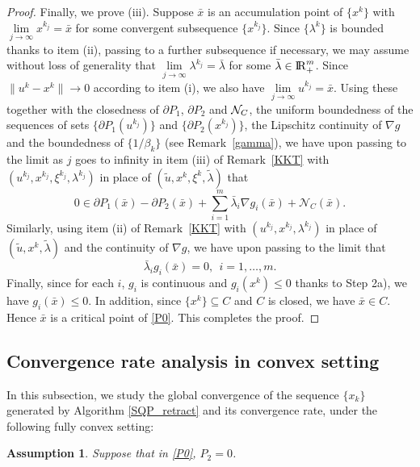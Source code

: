 \documentclass[10pt]{article}
\numberwithin{equation}{section}
\newtheorem{assumption}{Assumption}[section]
\def\R{{\rm I\!R}}
\begin{document}
\begin{proof}
Finally, we prove (iii). Suppose $\bar{x}$ is an accumulation point of $\{x^k\}$ with $\lim\limits_{j\rightarrow\infty}x^{k_j} = \bar{x}$ for some convergent subsequence $\{x^{k_j}\}$. Since $\{\lambda^k\}$ is bounded thanks to item (ii), passing to a further subsequence if necessary, we may assume without loss of generality that $\lim\limits_{j\rightarrow\infty}\lambda^{k_j} = \bar{\lambda}$ for some $\bar\lambda\in \R^m_+$. Since $\|u^k - x^k\|\rightarrow 0$ according to item (i), we also have $\lim\limits_{j\rightarrow\infty}u^{k_j} = \bar{x}$.
Using these together with the closedness of $\partial P_1$, $\partial P_2$ and ${\cal N}_C$, the uniform boundedness of the sequences of sets $\{\partial P_1(u^{k_j})\}$ and $\{\partial P_2(x^{k_j})\}$, the Lipschitz continuity of $\nabla g$ and the boundedness of $\{1/\beta_k\}$ (see Remark~\ref{gamma}), we have upon passing to the limit as $j$ goes to infinity in item (iii) of Remark~\ref{KKT} with $(u^{k_j},x^{k_j},\xi^{k_j},\lambda^{k_j})$ in place of $(\widetilde u,x^k,\xi^k,\widetilde\lambda)$ that
\[
0\in \partial P_1(\bar{x}) - \partial P_2(\bar{x}) + \sum\limits_{i=1}^m\bar{\lambda}_i\nabla g_i(\bar{x}) + \mathcal{N}_C(\bar{x}).
\]
Similarly, using item (ii) of Remark~\ref{KKT} with $(u^{k_j},x^{k_j},\lambda^{k_j})$ in place of $(\widetilde u,x^k,\widetilde\lambda)$ and the continuity of $\nabla g$, we have upon passing to the limit that
\[
\bar{\lambda}_i g_i(\bar{x}) = 0,\ \ i = 1, \ldots, m.
\]
Finally, since for each $i$, $g_i$ is continuous and $g_i(x^k)\leq0$ thanks to Step 2a), we have $g_i(\bar{x})\leq0$. In addition, since $\{x^k\}\subseteq C$ and $C$ is closed, we have $\bar{x}\in C$. Hence $\bar{x}$ is a {\color {black} critical point} of \eqref{P0}. This completes the proof.
\end{proof}

\subsection{Convergence rate analysis in convex setting}
In this subsection, we study the global convergence of the sequence $\{x_k\}$ generated by Algorithm \ref{SQP_retract} and its convergence rate, under the following fully convex setting:
\begin{assumption}\label{assumption3}
  Suppose that in \eqref{P0}, $P_2 = 0$.
\end{assumption}
\end{document}
